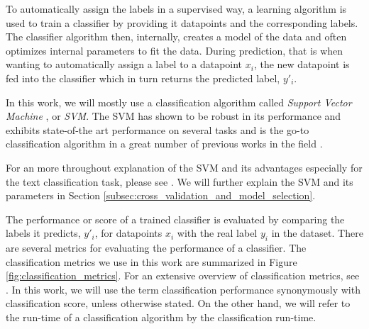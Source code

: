 To automatically assign the labels in a supervised way, a learning algorithm is used to train a classifier by providing it datapoints and the corresponding labels.
The classifier algorithm then, internally, creates a model of the data and often optimizes internal parameters to fit the data.
During prediction, that is when wanting to automatically assign a label to a datapoint $x_i$, the new datapoint is fed into the classifier which in turn returns the predicted label, $y'_i$.

In this work, we will mostly use a classification algorithm called \textit{Support Vector Machine} \cite{Cortes1995}, or \textit{SVM}.
The SVM has shown to be robust in its performance \cite{Joachims1998} and exhibits state-of-the art performance on several tasks and is the go-to classification algorithm in a great number of previous works in the field \cite{Joachims1998, Vitale2012, Neuhaus2006a,Kriege2012, Koronacki2008}.

For an more throughout explanation of the SVM and its advantages especially for the text classification task, please see \cite{Joachims1998}.
We will further explain the SVM and its parameters in Section \ref{subsec:cross_validation_and_model_selection}.

The performance or score of a trained classifier is evaluated by comparing the labels it predicts, $y'_i$,  for datapoints $x_i$ with the real label $y_i$ in the dataset.
There are several metrics for evaluating the performance of a classifier.
The classification metrics we use in this work are summarized in Figure \ref{fig:classification_metrics}.
For an extensive overview of classification metrics, see \cite{Forman2003}.
In this work, we will use the term classification performance synonymously with classification score, unless otherwise stated.
On the other hand, we will refer to the run-time of a classification algorithm by the classification run-time.


